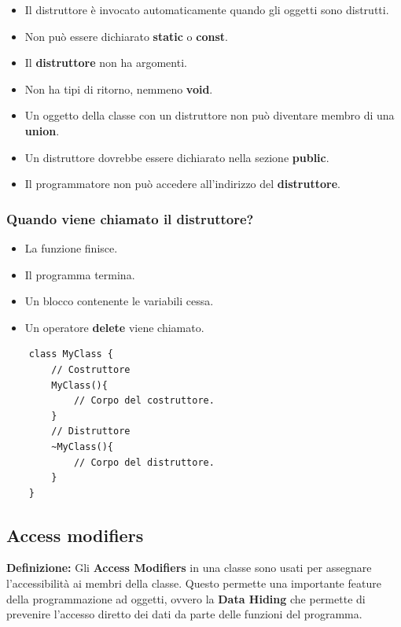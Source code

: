 \begin{itemize}
	\item \textsf{\small Il distruttore è invocato automaticamente quando gli oggetti sono distrutti.}
	\item \textsf{\small Non può essere dichiarato \textbf{static} o \textbf{const}.}
	\item \textsf{\small Il \textbf{distruttore} non ha argomenti.}
	\item \textsf{\small Non ha tipi di ritorno, nemmeno \textbf{void}.}
	\item \textsf{\small Un oggetto della classe con un distruttore non può diventare membro di una \textbf{union}.}
	\item \textsf{\small Un distruttore dovrebbe essere dichiarato nella sezione \textbf{public}.}
	\item \textsf{\small Il programmatore non può accedere all'indirizzo del \textbf{distruttore}.}
\end{itemize}

\subsubsection{Quando viene chiamato il distruttore?}

\begin{itemize}
	\item \textsf{\small La funzione finisce.}
	\item \textsf{\small Il programma termina.}
	\item \textsf{\small Un blocco contenente le variabili cessa.}
	\item \textsf{\small Un operatore \textbf{delete} viene chiamato.}
\end{itemize}

\begin{lstlisting}
	class MyClass {
		// Costruttore
		MyClass(){
			// Corpo del costruttore.
		}
		// Distruttore
		~MyClass(){
			// Corpo del distruttore.
		}
	}
\end{lstlisting}

\subsection{Access modifiers}

\textsf{\small \textbf{Definizione: } Gli \textbf{Access Modifiers} in una classe sono usati per assegnare l'accessibilità ai membri della classe. Questo permette una importante feature della programmazione ad oggetti, ovvero la \textbf{Data Hiding} che permette di prevenire l'accesso diretto dei dati da parte delle funzioni del programma.} \\

